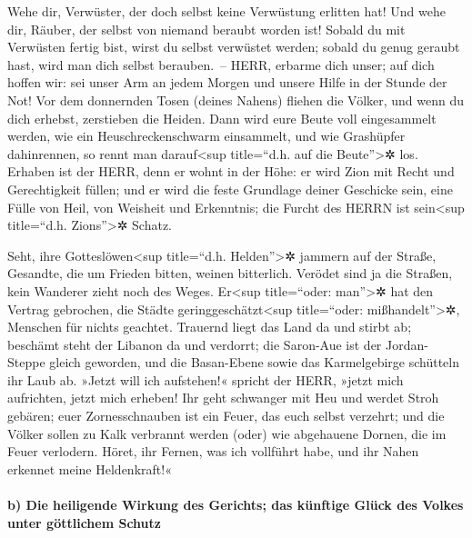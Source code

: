 Wehe dir, Verwüster, der doch selbst keine Verwüstung
erlitten hat! Und wehe dir, Räuber, der selbst von niemand beraubt
worden ist! Sobald du mit Verwüsten fertig bist, wirst du selbst
verwüstet werden; sobald du genug geraubt hast, wird man dich selbst
berauben.~-- HERR, erbarme dich unser; auf dich hoffen
wir: sei unser Arm an jedem Morgen und unsere Hilfe in der Stunde der
Not! Vor dem donnernden Tosen (deines Nahens) fliehen die
Völker, und wenn du dich erhebst, zerstieben die Heiden.
Dann wird eure Beute voll eingesammelt werden, wie ein
Heuschreckenschwarm einsammelt, und wie Grashüpfer dahinrennen, so rennt
man darauf\textless sup title=``d.h. auf die Beute''\textgreater✲ los.
Erhaben ist der HERR, denn er wohnt in der Höhe: er wird
Zion mit Recht und Gerechtigkeit füllen; und er wird die
feste Grundlage deiner Geschicke sein, eine Fülle von Heil, von Weisheit
und Erkenntnis; die Furcht des HERRN ist sein\textless sup title=``d.h.
Zions''\textgreater✲ Schatz.

Seht, ihre Gotteslöwen\textless sup title=``d.h.
Helden''\textgreater✲ jammern auf der Straße, Gesandte, die um Frieden
bitten, weinen bitterlich. Verödet sind ja die Straßen,
kein Wanderer zieht noch des Weges. Er\textless sup title=``oder:
man''\textgreater✲ hat den Vertrag gebrochen, die Städte
geringgeschätzt\textless sup title=``oder: mißhandelt''\textgreater✲,
Menschen für nichts geachtet. Trauernd liegt das Land da
und stirbt ab; beschämt steht der Libanon da und verdorrt; die Saron-Aue
ist der Jordan-Steppe gleich geworden, und die Basan-Ebene sowie das
Karmelgebirge schütteln ihr Laub ab. »Jetzt will ich
aufstehen!« spricht der HERR, »jetzt mich aufrichten, jetzt mich
erheben! Ihr geht schwanger mit Heu und werdet Stroh
gebären; euer Zornesschnauben ist ein Feuer, das euch selbst verzehrt;
und die Völker sollen zu Kalk verbrannt werden (oder) wie
abgehauene Dornen, die im Feuer verlodern. Höret, ihr
Fernen, was ich vollführt habe, und ihr Nahen erkennet meine
Heldenkraft!«

\hypertarget{b-die-heiligende-wirkung-des-gerichts-das-kuxfcnftige-gluxfcck-des-volkes-unter-guxf6ttlichem-schutz}{%
\paragraph{b) Die heiligende Wirkung des Gerichts; das künftige Glück
des Volkes unter göttlichem
Schutz}\label{b-die-heiligende-wirkung-des-gerichts-das-kuxfcnftige-gluxfcck-des-volkes-unter-guxf6ttlichem-schutz}}

